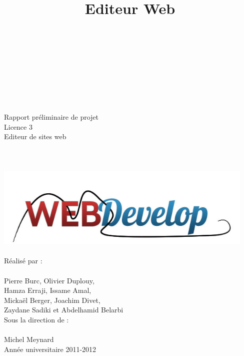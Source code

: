 \documentclass[a4paper, 12pt]{report}
\title{Editeur Web}
\begin{document}
	\begin{titlepage}
			\\ 
		~\\
		~\\
		~\\
		~\\
		~\\		
		\begin{center}
			{\large Rapport préliminaire de projet} \\
			{\large Licence 3}\\
			\vspace{1,5cm}
			{\Huge Editeur de sites web}\\
			~\\
			~\\
			~\\
			\includegraphics[width=12.5cm]{images/logoTest1.png}
			~\\
			~\\
			{\large Réalisé par :} \\
			~\\
			{\LARGE Pierre Burc, Olivier Duplouy, \\
				      Hamza Erraji, Issame Amal,\\
				      Mickaël Berger, Joachim Divet,\\
				      Zaydane Sadiki et Abdelhamid Belarbi}\\
			\vspace{1,5cm}
			{\large Sous la direction de :} \\
			~\\
			{\LARGE Michel Meynard} \\
			\vspace{2.5cm}
			{\large Année universitaire 2011-2012}			
		\end{center}
	\end{titlepage}
\end{document}

